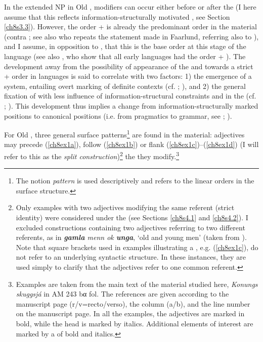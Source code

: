 \documentclass[output=paper,colorlinks,citecolor=brown]{langscibook}
\begin{document}
In the extended NP in Old , modifiers can occur either before or
after the  (I here assume that this reflects information-structurally
motivated , see Section \ref{ch8s3.3}). However, the order   +
 is already the predominant order in the material (contra \citealp[68]{Faarlund04}; see also \citealp[394]{Mørck2016} who repeats the statement made in
Faarlund, referring also to \citealp[19ff]{Ringdal1918}), and I assume, in
opposition to \citet{vanGelderenLohndal2008}, that this is the base
order at this stage of the language (see also , who
show that all early  languages had the order  + ).
The development away from the possibility of  appearance of
the  and towards a strict  +  order in 
languages is said to correlate with two factors: 1) the emergence of a
 system, entailing overt marking of definite contexts (cf. \citealp{vanGelderenLohndal2008}; \citealp{Pfaff2019}), and 2) the general fixation of
 with less influence of information-structural constraints
and  in the  (cf. \citealp{Fischer06,Fischer12}; \citealp{Tiemann2022}). This development thus implies a change from
information-structurally marked positions to canonical positions (i.e.
from pragmatics to grammar, see \citealp{SankoffBrown1976}; \citealp{Givón1979}).

For Old , three general surface patterns\footnote{The notion
  \emph{pattern} is used descriptively and refers to the linear orders
  in the surface structure.} are found in the  material:
adjectives may precede (\ref{ch8ex1a}), follow (\ref{ch8ex1b}) or flank (\ref{ch8ex1c})--(\ref{ch8ex1d}) (I will refer
to this as the \emph{split construction})\footnote{Only examples with two
  adjectives modifying the same referent (strict identity) were
  considered under the  (see Sections \ref{ch8s4.1} and \ref{ch8s4.2}). I
  excluded constructions containing two adjectives referring to two
  different referents, as in \emph{\textbf{gamla} {menn} ok
  \textbf{unga}}, `old and young men' (taken from \citealp[7]{Bech17}). Note that square brackets used in examples illustrating a , e.g. (\ref{ch8ex1c}), do not refer to an underlying syntactic structure. In these instances, they are used simply to clarify that the adjectives refer to one common referent.} the
 they modify.\footnote{Examples are taken from the main text of the  material studied here, \textit{Konungs skuggsjá} in AM 243 bα fol. The references are given according to the manuscript page (r/v=recto/verso), the column (a/b), and the line number on the manuscript page. In all the examples, the adjectives are marked in bold, while the head  is marked by italics. Additional elements of interest are marked by a  of bold and italics.}
\end{document}
